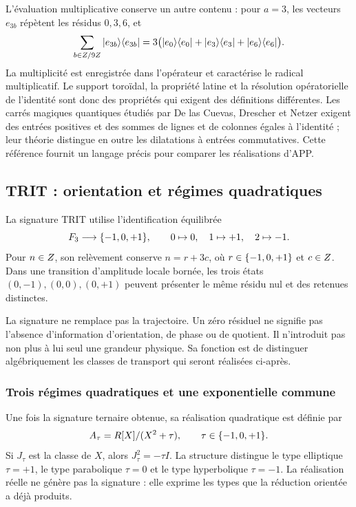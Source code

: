 L'évaluation multiplicative conserve un autre contenu : pour \(a=3\), les
vecteurs \(e_{3b}\) répètent les résidus \(0,3,6\), et
\[
 \sum_{b\in Z/9Z}|e_{3b}\rangle\langle e_{3b}|
 =3\bigl(|e_0\rangle\langle e_0|+|e_3\rangle\langle e_3|
                    +|e_6\rangle\langle e_6|\bigr).
\]
La multiplicité est enregistrée dans l'opérateur et caractérise le radical
multiplicatif. Le support toroïdal, la propriété latine et la
résolution opératorielle de l'identité sont donc des propriétés qui exigent
des définitions différentes. Les carrés magiques quantiques étudiés par
De las Cuevas, Drescher et Netzer exigent des entrées positives et des sommes de lignes
et de colonnes égales à l'identité ; leur théorie distingue en outre les
dilatations à entrées commutatives\cite{delascuevas2020}. Cette référence
fournit un langage précis pour comparer les réalisations d'APP.

\subsection{TRIT : orientation et régimes quadratiques}

\begin{definition}
La signature TRIT utilise l'identification équilibrée
\[
 F_3\longrightarrow\{-1,0,+1\},\qquad 0\mapsto0,\quad1\mapsto+1,\quad2\mapsto-1.
\]
Pour \(n\in Z\), son relèvement conserve \(n=r+3c\), où \(r\in\{-1,0,+1\}\) et \(c\in Z\). Dans une transition d'amplitude locale bornée, les trois états \((0,-1),(0,0),(0,+1)\) peuvent présenter le même résidu nul et des retenues distinctes.
\end{definition}

La signature ne remplace pas la trajectoire. Un zéro résiduel ne signifie pas l'absence d'information d'orientation, de phase ou de quotient. Il n'introduit pas non plus à lui seul une grandeur physique. Sa fonction est de distinguer algébriquement les classes de transport qui seront réalisées ci-après.

\subsubsection{Trois régimes quadratiques et une exponentielle commune}

Une fois la signature ternaire obtenue, sa réalisation quadratique est définie par
\begin{equation}
 \mathbb A_\tau=\RR[X]/(X^2+\tau),\qquad \tau\in\TRIT.
 \label{eq:algebras-trit}
\end{equation}
Si \(J_\tau\) est la classe de \(X\), alors \(J_\tau^2=-\tau I\). La structure distingue le type elliptique \(\tau=+1\), le type parabolique \(\tau=0\) et le type hyperbolique \(\tau=-1\). La réalisation réelle ne génère pas la signature : elle exprime les types que la réduction orientée a déjà produits.

